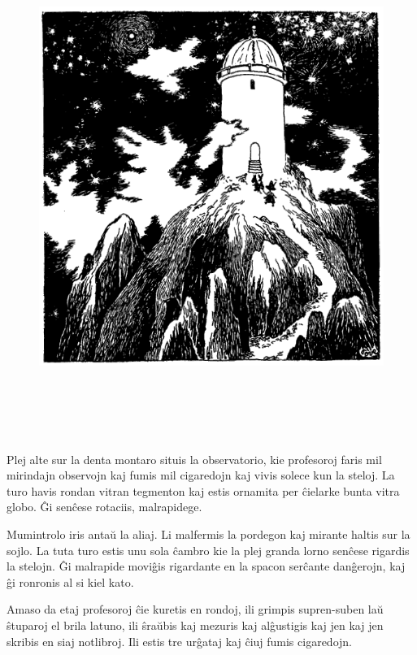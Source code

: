 \sectionbreak


\begin{figure}[htbp]
\centering
\includegraphics[width=443pt,height=462pt]{4-5.png}
\caption{}
\label{4-5}
\end{figure}

Plej alte sur la denta montaro situis la observatorio, kie profesoroj faris mil mirindajn observojn kaj fumis mil cigaredojn kaj vivis solece kun la steloj. La turo havis rondan vitran tegmenton kaj estis ornamita per ĉielarke bunta vitra globo. Ĝi senĉese rotaciis, malrapidege.

Mumintrolo iris antaŭ la aliaj. Li malfermis la pordegon kaj mirante haltis sur la sojlo. La tuta turo estis unu sola ĉambro kie la plej granda lorno senĉese rigardis la stelojn. Ĝi malrapide moviĝis rigardante en la spacon serĉante danĝerojn, kaj ĝi ronronis al si kiel kato.

Amaso da etaj profesoroj ĉie kuretis en rondoj, ili grimpis supren-suben laŭ ŝtuparoj el brila latuno, ili ŝraŭbis kaj mezuris kaj alĝustigis kaj jen kaj jen skribis en siaj notlibroj. Ili estis tre urĝataj kaj ĉiuj fumis cigaredojn.

